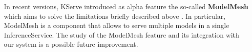 In recent versions, KServe introduced as alpha feature the so-called \textbf{ModelMesh} which aims to solve the limitations briefly described above \cite{kserve_multi_model}.
In particular, ModelMesh is a component that allows to serve multiple models in a single InferenceService.
The study of the ModelMesh feature and its integration with our system is a possible future improvement.


\newpage
